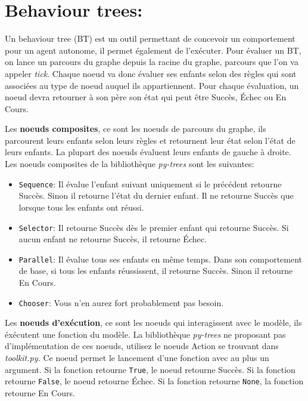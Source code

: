 \documentclass{article}
\begin{document}
\section{Behaviour trees:}
\label{sec-4}

Un behaviour tree (BT) est un outil permettant de concevoir un comportement pour un agent autonome, il permet également de l'exécuter. Pour évaluer un BT, on lance un parcours du graphe depuis la racine du graphe, parcours que l'on va appeler \emph{tick}. Chaque noeud va donc évaluer ses enfants selon des règles qui sont associées au type de noeud auquel ils appartiennent. Pour chaque évaluation, un noeud devra retourner à son père son état qui peut être Succès, Échec ou En Cours.

\clearpage

\noindent
Les \textbf{noeuds composites}, ce sont les noeuds de parcours du graphe, ils parcourent leurs enfants selon leurs règles et retournent leur état selon l'état de leurs enfants. La plupart des noeuds évaluent leurs enfants de gauche à droite. Les noeuds composites de la bibliothèque \emph{py-trees} sont les suivantes:
\begin{itemize}
\item \verb~Sequence~: Il évalue l'enfant suivant uniquement si le précédent retourne Succès. Sinon il retourne l'état du dernier enfant. Il ne retourne Succès que lorsque tous les enfants ont réussi.
\item \verb~Selector~: Il retourne Succès dès le premier enfant qui retourne Succès. Si aucun enfant ne retourne Succès, il retourne Échec.
\item \verb~Parallel~: Il évalue tous ses enfants en même temps. Dans son comportement de base, si tous les enfants réussissent, il retourne Succès. Sinon il retourne En Cours.
\item \verb~Chooser~: Vous n'en aurez fort probablement pas besoin.
\end{itemize}

\noindent
Les \textbf{noeuds d'exécution}, ce sont les noeuds qui interagissent avec le modèle, ils éxécutent une fonction du modèle. La bibliothèque \emph{py-trees} ne proposant pas d'implémentation de ces noeuds, utilisez le noeuds Action se trouvant dans \emph{toolkit.py.} Ce noeud permet le lancement d'une fonction avec au plus un argument. Si la fonction retourne \verb~True~, le noeud retourne Succès. Si la fonction retourne \verb~False~, le noeud retourne Échec. Si la fonction retourne \verb~None~, la fonction retourne En Cours.
\end{document}
